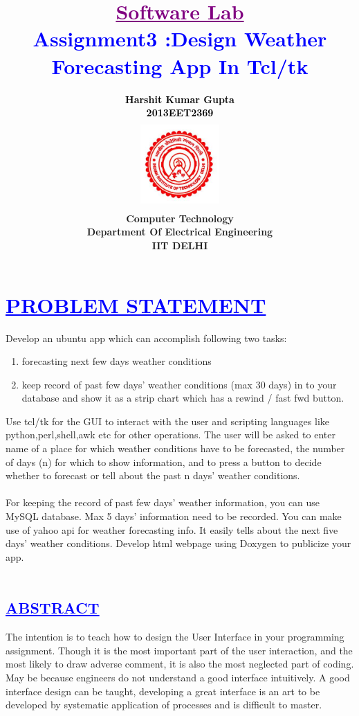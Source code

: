 \documentclass[a4paper,12pt]{report}
\title{\bfseries\huge \textcolor{purple}{\underline {Software Lab}} \\{\textcolor{blue}{Assignment3 :Design Weather Forecasting App In Tcl/tk}}}
\author{\bfseries\large\textcolor{black}  {Harshit Kumar Gupta}\\ {\textcolor{black} {2013EET2369 }}\\
\includegraphics[width=3cm,height=3.4cm]{./iit.png}\\\noindent Computer Technology\\
\noindent Department Of Electrical Engineering\\IIT DELHI}
\begin{document}
\maketitle
\tableofcontents


\chapter{\textcolor{blue}{\underline {PROBLEM STATEMENT}}}
\noindent Develop an ubuntu app which can accomplish following two tasks:
\begin{enumerate}
 \item  forecasting next few days weather conditions
 \item   keep record of past few days' weather conditions (max 30 days) in to your database and show it as a strip chart which has a rewind / fast fwd button.
\end{enumerate}

\noindent Use tcl/tk for the GUI to interact with the user and scripting languages like python,perl,shell,awk etc  for other operations. The user will be asked to enter name of a place for  which weather conditions have to be forecasted, the number of days (n) for which to show information, and to press a button to decide whether to forecast or tell about the past n days' weather conditions.\\\\
For keeping the record of past few days' weather information, you can use MySQL database. Max 5 days' information need to be recorded.
You can make use of yahoo api for weather forecasting info. It easily tells about the next five days' weather conditions.
Develop html webpage using Doxygen to publicize your app.\\\\


\begin{center}
\chapter{\textcolor{blue}{\underline {ABSTRACT}}}
\end{center}
\noindent The intention is to teach how to design the User Interface in your programming assignment. Though it is the most important part of the user interaction, and the most likely to draw adverse comment, it is also the most neglected part of coding. May be because engineers do not understand a good interface intuitively. A good interface design can be taught, developing a great interface is an art to be developed by systematic application of processes and is difficult to master.
\end{document}
